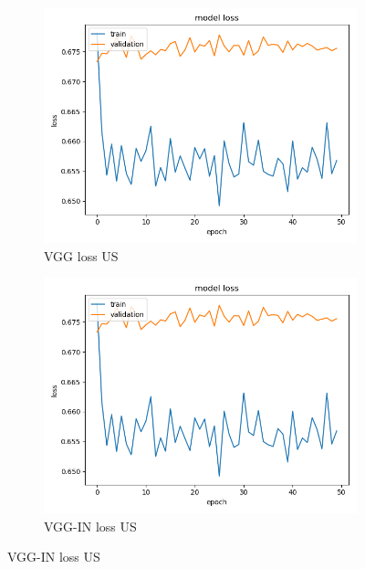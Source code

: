 \begin{figure}[h]
\begin{subfigure}[b]{.24\linewidth}
\includegraphics[width=\linewidth]{Figs/vgg_us_loss.jpg}
\caption{VGG loss US}
\end{subfigure}
\begin{subfigure}[b]{.24\linewidth}
\includegraphics[width=\linewidth]{Figs/vgg_us_loss.jpg}
\caption{VGG-IN loss US}
\end{subfigure}


\end{figure}
